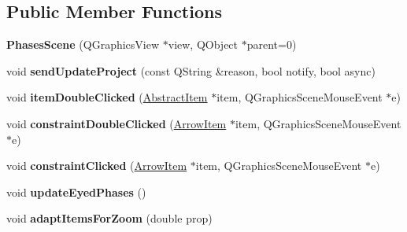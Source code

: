 \subsection*{Public Member Functions}
\begin{DoxyCompactItemize}
\item 
\hypertarget{class_phases_scene_aff55060a4599e72a5b1e3cddaa20226f}{{\bfseries Phases\-Scene} (Q\-Graphics\-View $\ast$view, Q\-Object $\ast$parent=0)}\label{class_phases_scene_aff55060a4599e72a5b1e3cddaa20226f}

\item 
\hypertarget{class_phases_scene_a1c04c5e2a10acb76ec12602ec8c9e694}{void {\bfseries send\-Update\-Project} (const Q\-String \&reason, bool notify, bool async)}\label{class_phases_scene_a1c04c5e2a10acb76ec12602ec8c9e694}

\item 
\hypertarget{class_phases_scene_a056de13cf1ec76240e3f6743c1801728}{void {\bfseries item\-Double\-Clicked} (\hyperlink{class_abstract_item}{Abstract\-Item} $\ast$item, Q\-Graphics\-Scene\-Mouse\-Event $\ast$e)}\label{class_phases_scene_a056de13cf1ec76240e3f6743c1801728}

\item 
\hypertarget{class_phases_scene_a801b474e09eb3dbad6d45014051f0e56}{void {\bfseries constraint\-Double\-Clicked} (\hyperlink{class_arrow_item}{Arrow\-Item} $\ast$item, Q\-Graphics\-Scene\-Mouse\-Event $\ast$e)}\label{class_phases_scene_a801b474e09eb3dbad6d45014051f0e56}

\item 
\hypertarget{class_phases_scene_a2a033338017cb12432d7681d11629de7}{void {\bfseries constraint\-Clicked} (\hyperlink{class_arrow_item}{Arrow\-Item} $\ast$item, Q\-Graphics\-Scene\-Mouse\-Event $\ast$e)}\label{class_phases_scene_a2a033338017cb12432d7681d11629de7}

\item 
\hypertarget{class_phases_scene_abd1fe5758f831677e63f6388fc65c5b8}{void {\bfseries update\-Eyed\-Phases} ()}\label{class_phases_scene_abd1fe5758f831677e63f6388fc65c5b8}

\item 
\hypertarget{class_phases_scene_ae78fa147b7fb22dbfe7be1bb26e3cde2}{void {\bfseries adapt\-Items\-For\-Zoom} (double prop)}\label{class_phases_scene_ae78fa147b7fb22dbfe7be1bb26e3cde2}

\end{DoxyCompactItemize}
